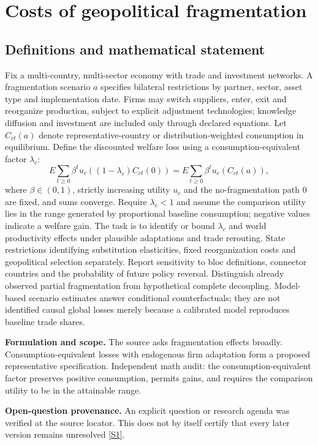 \documentclass[11pt]{article}
\newcommand{\sref}[2]{\hyperlink{source:#1:#2}{[S#2]}}
\begin{document}
\section*{Costs of geopolitical fragmentation}\label{30007626}
\subsection{Definitions and mathematical statement}
Fix a multi-country, multi-sector economy with trade and investment networks. A fragmentation scenario \(a\) specifies bilateral restrictions by partner, sector, asset type and implementation date. Firms may switch suppliers, enter, exit and reorganize production, subject to explicit adjustment technologies; knowledge diffusion and investment are included only through declared equations. Let \(C_{ct}(a)\) denote representative-country or distribution-weighted consumption in equilibrium. Define the discounted welfare loss using a consumption-equivalent factor \(\lambda_c\):
\[E\sum_{t\geq0}\beta^t u_c((1-\lambda_c)C_{ct}(0))=E\sum_{t\geq0}\beta^t u_c(C_{ct}(a)),\]
where \(\beta\in(0,1)\), strictly increasing utility \(u_c\) and the no-fragmentation path \(0\) are fixed, and sums converge. Require \(\lambda_c<1\) and assume the comparison utility lies in the range generated by proportional baseline consumption; negative values indicate a welfare gain. The task is to identify or bound \(\lambda_c\) and world productivity effects under plausible adaptations and trade rerouting. State restrictions identifying substitution elasticities, fixed reorganization costs and geopolitical selection separately. Report sensitivity to bloc definitions, connector countries and the probability of future policy reversal. Distinguish already observed partial fragmentation from hypothetical complete decoupling. Model-based scenario estimates answer conditional counterfactuals; they are not identified causal global losses merely because a calibrated model reproduces baseline trade shares.

\par\textbf{Formulation and scope.} The source asks fragmentation effects broadly. Consumption-equivalent losses with endogenous firm adaptation form a proposed representative specification. Independent math audit: the consumption-equivalent factor preserves positive consumption, permits gains, and requires the comparison utility to be in the attainable range.

\par\textbf{Open-question provenance.} An explicit question or research agenda was verified at the source locator. This does not by itself certify that every later version remains unresolved \sref{30007626}{1}.
\end{document}
